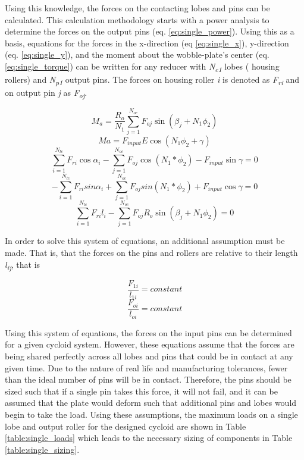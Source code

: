 Using this knowledge, the forces on the contacting lobes and pins can be calculated. This calculation methodology starts with a power analysis to determine the forces on the output pins (eq. \ref{eq:single_power}). Using this as a basis, equations for the forces in the x-direction (eq \ref{eq:single_x}), y-direction (eq. \ref{eq:single_y}), and the moment about the wobble-plate's center (eq. \ref{eq:single_torque}) can be written for any reducer with \textit{N\textsubscript{c1}} lobes ( housing rollers) and \textit{N\textsubscript{p1}} output pins. The forces on housing roller \textit{i} is denoted as \textit{F\textsubscript{ri}} and on output pin \textit{j} as \textit{F\textsubscript{oj}}.

\begin{equation} \label{eq:single_power}
M_a = \frac{R_o}{N_1} \sum_{j=1}^{N_{oc}} F_{oj} \sin(\beta_j + N_1 \phi_2)
\end{equation}
\begin{equation} \label{eq:single_input}
Ma = F_{input} E \cos(N_1 \phi_2 + \gamma)
\end{equation}
\begin{equation} \label{eq:single_x}
\sum_{i=1}^{N_{lc}} F_{ri} \cos{\alpha_i} - \sum_{j=1}^{N_{oc}} F_{oj} \cos(N_1*\phi_2) - F_{input} \sin{\gamma} = 0
\end{equation}
\begin{equation} \label{eq:single_y}
-\sum_{i=1}^{N_{lc}} F_{ri} sin{\alpha_i} + \sum_{j=1}^{N_{oc}} F_{oj} sin(N_1*\phi_2) + F_{input} \cos{\gamma} = 0
\end{equation}
\begin{equation} \label{eq:single_torqe}
\sum_{i=1}^{N_{lc}}F_{ri} l_i - \sum_{j=1}^{N_{oc}}F_{oj} R_o \sin(\beta_j + N_1 \phi_2) = 0
\end{equation}

In order to solve this system of equations, an additional assumption must be made. That is, that the forces on the pins and rollers are relative to their length \textit{l\textsubscript{ij}}, that is 

\begin{equation} 
\frac{F_{1i}}{l_{1i}} = constant 
\end{equation}
\begin{equation}
\frac{F_{oi}}{l_{oi}} = constant
\end{equation}

Using this system of equations, the forces on the input pins can be determined for a given cycloid system. However, these equations assume that the forces are being shared perfectly across all lobes and pins that could be in contact at any given time. Due to the nature of real life and manufacturing tolerances, fewer than the ideal number of pins will be in contact. Therefore, the pins should be sized such that if a single pin takes this force, it will not fail, and it can be assumed that the plate would deform such that additional pins and lobes would begin to take the load. Using these assumptions, the maximum loads on a single lobe and output roller for the designed cycloid are shown in Table \ref{table:single_loads} which leads to the necessary sizing of components in Table \ref{table:single_sizing}.

